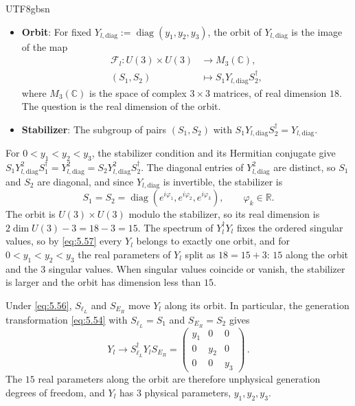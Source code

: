 \documentclass[11pt,a4paper,oneside]{report}
\newenvironment{qftinset}{\begin{list}{}{\setlength{\leftmargin}{2em}\setlength{\rightmargin}{0pt}\setlength{\listparindent}{\parindent}}\item[]}{\end{list}}
\begin{document}
\begin{CJK*}{UTF8}{gbsn}
\begin{qftinset}
\begin{itemize}
\item \textbf{\boldmath Orbit}: For fixed $Y_{l,\mathrm{diag}}:=\operatorname{diag}(y_1,y_2,y_3)$, the orbit of $Y_{l,\mathrm{diag}}$ is the image of the map
\begin{equation*}
\begin{aligned}
\mathcal F_l: U(3)\times U(3)&\to M_3(\mathbb C),\\
(S_1,S_2)&\mapsto S_1Y_{l,\mathrm{diag}}S_2^\dagger,
\end{aligned}
\tag{5.58}\label{eq:5.58}
\end{equation*}
where $M_3(\mathbb C)$ is the space of complex $3\times3$ matrices, of real dimension $18$. The question is the real dimension of the orbit.

\item \textbf{\boldmath Stabilizer}: The subgroup of pairs $(S_1,S_2)$ with $S_1Y_{l,\mathrm{diag}}S_2^\dagger=Y_{l,\mathrm{diag}}$.
\end{itemize}


For $0<y_1<y_2<y_3$, the stabilizer condition and its Hermitian conjugate give $S_1Y_{l,\mathrm{diag}}^2S_1^\dagger=Y_{l,\mathrm{diag}}^2=S_2Y_{l,\mathrm{diag}}^2S_2^\dagger$. The diagonal entries of $Y_{l,\mathrm{diag}}^2$ are distinct, so $S_1$ and $S_2$ are diagonal, and since $Y_{l,\mathrm{diag}}$ is invertible, the stabilizer is
\begin{equation*}
S_1=S_2=\operatorname{diag}(e^{i\varphi_1},e^{i\varphi_2},e^{i\varphi_3}),\qquad \varphi_k\in\mathbb R .
\tag{5.59}\label{eq:5.59}
\end{equation*}
The orbit is $U(3)\times U(3)$ modulo the stabilizer, so its real dimension is $2\dim U(3)-3=18-3=15$. The spectrum of $Y_l^\dagger Y_l$ fixes the ordered singular values, so by \eqref{eq:5.57} every $Y_l$ belongs to exactly one orbit, and for $0<y_1<y_2<y_3$ the real parameters of $Y_l$ split as $18=15+3$: $15$ along the orbit and the $3$ singular values. When singular values coincide or vanish, the stabilizer is larger and the orbit has dimension less than $15$.

Under \eqref{eq:5.56}, $S_{\ell_L}$ and $S_{E_R}$ move $Y_l$ along its orbit. In particular, the generation transformation \eqref{eq:5.54} with $S_{\ell_L}=S_1$ and $S_{E_R}=S_2$ gives
\begin{equation*}
{\displaystyle Y_l\to S_{\ell_L}^\dagger Y_lS_{E_R}=\begin{pmatrix}y_1&0&0\\0&y_2&0\\0&0&y_3\end{pmatrix}}\,.
\tag{5.60}\label{eq:5.60}
\end{equation*}
The $15$ real parameters along the orbit are therefore unphysical generation degrees of freedom, and $Y_l$ has $3$ physical parameters, $y_1,y_2,y_3$.


\end{qftinset}
\end{CJK*}
\end{document}
